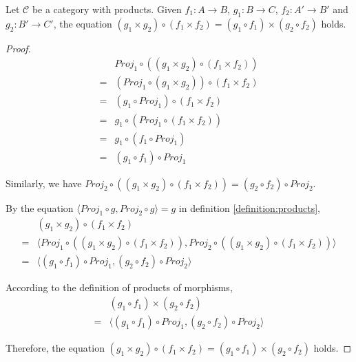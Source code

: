 \begin{proposition}
Let $ \mathcal{C} $ be a category with products. Given $ f_1 : A \to B $, $ g_1 : B \to C $, $ f_2 : A' \to B' $ and $ g_2 : B' \to C' $, the equation $ ( g_1 \times g_2 ) \circ ( f_1 \times f_2 ) = ( g_1 \circ f_1 ) \times ( g_2 \circ f_2 ) $ holds.
\end{proposition}
\begin{proof}
\begin{equation*}
\begin{array}{ll}
  & Proj_1 \circ ( ( g_1 \times g_2 ) \circ ( f_1 \times f_2 ) )\\
= & ( Proj_1 \circ ( g_1 \times g_2 ) ) \circ ( f_1 \times f_2 )\\
= & ( g_1 \circ Proj_1 ) \circ ( f_1 \times f_2 )\\
= & g_1 \circ ( Proj_1 \circ ( f_1 \times f_2 ) )\\
= & g_1 \circ ( f_1 \circ Proj_1)\\
= & ( g_1 \circ f_1 ) \circ Proj_1
\end{array}
\end{equation*}

Similarly, we have $ Proj_2 \circ ( ( g_1 \times g_2 ) \circ ( f_1 \times f_2 ) ) = ( g_2 \circ f_2 ) \circ Proj_2 $.

By the equation $ \langle Proj_1 \circ g , Proj_2 \circ g \rangle = g $ in definition \ref{definition:products},
\begin{equation*}
\begin{array}{ll}
  & ( g_1 \times g_2 ) \circ ( f_1 \times f_2 )\\
= & \langle Proj_1 \circ ( ( g_1 \times g_2 ) \circ ( f_1 \times f_2 ) ) , Proj_2 \circ ( ( g_1 \times g_2 ) \circ ( f_1 \times f_2 ) ) \rangle \\
= & \langle ( g_1 \circ f_1 ) \circ Proj_1 , ( g_2 \circ f_2 ) \circ Proj_2 \rangle
\end{array}
\end{equation*}

According to the definition of products of morphisms,
\begin{equation*}
\begin{array}{ll}
  & ( g_1 \circ f_1 ) \times ( g_2 \circ f_2 )\\
= & \langle ( g_1 \circ f_1 ) \circ Proj_1 , ( g_2 \circ f_2 ) \circ Proj_2 \rangle
\end{array}
\end{equation*}

Therefore, the equation $ ( g_1 \times g_2 ) \circ ( f_1 \times f_2 ) = ( g_1 \circ f_1 ) \times ( g_2 \circ f_2 ) $ holds.
\end{proof}


